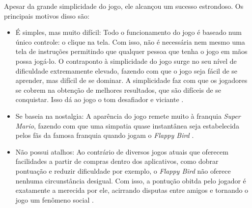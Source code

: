 Apesar da grande simplicidade do jogo, ele alcançou um sucesso estrondoso. Os principais motivos disso são:


\begin{itemize}
\item É simples, mas muito difícil: Todo o funcionamento do jogo é baseado num único controle: o clique na tela. Com isso, não é necessária nem mesmo uma tela de instruções permitindo que qualquer pessoa que tenha o jogo em mãos possa jogá-lo. O contraponto à simplicidade do jogo surge no seu nível de dificuldade extremamente elevado, fazendo com que o jogo seja fácil de se aprender, mas difícil de se dominar. A simplicidade faz com que os jogadores se cobrem na obtenção de melhores resultados, que são difíceis de se conquistar. Isso dá ao jogo o tom desafiador e viciante \cite{Dino2014}.
\item Se baseia na nostalgia: A aparência do jogo remete muito à franquia \textit{Super Mario}, fazendo com que uma simpatia quase instantânea seja estabelecida pelos fãs da famosa franquia quando jogam o \textit{Flappy Bird} \cite{Dino2014}.
\item Não possui atalhos: Ao contrário de diversos jogos atuais que oferecem facilidades a partir de compras dentro dos aplicativos, como dobrar pontuação e reduzir dificuldade por exemplo, o \textit{Flappy Bird} não oferece nenhuma circunstância desigual. Com isso, a pontução obitda pelo jogador é exatamente a merecida por ele, acirrando disputas entre amigos e tornando o jogo um fenômeno social \cite{Dino2014}.
\end{itemize}

